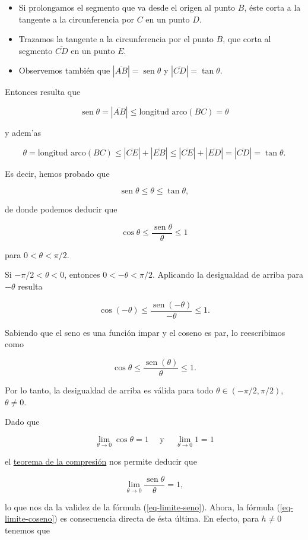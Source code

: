 \documentclass[
  letterpaper,
]{book}
\theoremstyle{plain}
\theoremstyle{remark}
\begin{document}
\begin{itemize}
\item
  Si prolongamos el segmento que va desde el origen al punto \(B\), éste
  corta a la tangente a la circunferencia por \(C\) en un punto \(D\).
\item
  Trazamos la tangente a la circunferencia por el punto \(B\), que corta
  al segmento \(\overline{CD}\) en un punto \(E\).
\item
  Observemos también que \(|\overline{AB}|=\operatorname{sen} \theta\) y
  \(|\overline{CD}|=\tan \theta\).
\end{itemize}

Entonces resulta que

\[
\operatorname{sen}\theta =|\overline{AB}|\leq \text{longitud arco}(BC)=\theta
\]

y adem'as

\[
\theta = \text{longitud arco}(BC)\leq |\overline{CE}|+|\overline{EB}|\leq |\overline{CE}|+|\overline{ED}|=|\overline{CD}|=\tan \theta.
\]

Es decir, hemos probado que

\[
\operatorname{sen}{\theta} \leq \theta \leq \tan\theta, 
\]

de donde podemos deducir que

\[
\cos \theta \leq \frac{\operatorname{sen} \theta}{\theta}\leq 1
\]

para \(0<\theta<\pi/2\).

Si \(-\pi/2<\theta<0\), entonces \(0<-\theta<\pi/2\). Aplicando la
desigualdad de arriba para \(-\theta\) resulta

\[
\cos (-\theta) \leq \frac{\operatorname{sen} (-\theta)}{-\theta}\leq 1.
\]

Sabiendo que el seno es una función impar y el coseno es par, lo
reescribimos como

\[
\cos \theta \leq \frac{\operatorname{sen} (\theta)}{\theta}\leq 1.
\]

Por lo tanto, la desigualdad de arriba es válida para todo
\(\theta\in (-\pi/2,\pi/2)\), \(\theta\neq 0\).

Dado que

\[
\lim_{\theta\to 0} \cos \theta=1 \quad\text{ y }\quad\lim_{\theta \to 0}1=1
\]

el \hyperref[teo-compresion]{teorema de la compresión} nos permite
deducir que

\[
\lim_{\theta\to 0} \frac{\operatorname{sen}\theta}{\theta}=1,
\]

lo que nos da la validez de la fórmula (\ref{eq-limite-seno}). Ahora, la
fórmula (\ref{eq-limite-coseno}) es consecuencia directa de ésta última.
En efecto, para \(h\neq 0\) tenemos que
\end{document}
